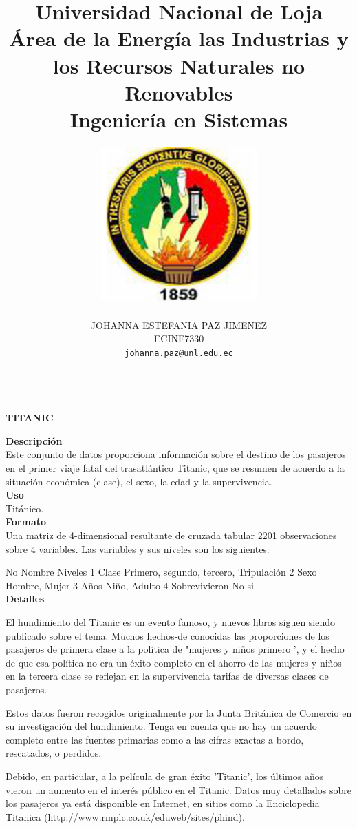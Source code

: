\documentclass[10pt]{report}
\title{\Huge Universidad Nacional de Loja \\ 
Área de la Energía las Industrias y los Recursos Naturales no Renovables \\
Ingeniería en Sistemas \\}
\author{\includegraphics[width=6cm, height=6cm]{unloja.png}\\\\   
  JOHANNA ESTEFANIA PAZ JIMENEZ \\ ECINF7330\\  \texttt{johanna.paz@unl.edu.ec}\\ \\
}
\begin{document}

\maketitle
\begin{center}\textbf{\Large TITANIC}\end{center}

\textbf{Descripción}\\

Este conjunto de datos proporciona información sobre el destino de los pasajeros en el primer viaje fatal del trasatlántico Titanic, que se resumen de acuerdo a la situación económica (clase), el sexo, la edad y la supervivencia.\\

\textbf{Uso}\\

Titánico.\\

\textbf{Formato}\\

Una matriz de 4-dimensional resultante de cruzada tabular 2201 observaciones sobre 4 variables. Las variables y sus niveles son los siguientes:

No	Nombre	Niveles
1	Clase	Primero, segundo, tercero, Tripulación
2	Sexo	Hombre, Mujer
3	Años	Niño, Adulto
4	Sobrevivieron	No si\\


\textbf{Detalles}

El hundimiento del Titanic es un evento famoso, y nuevos libros siguen siendo publicado sobre el tema. Muchos hechos-de conocidas las proporciones de los pasajeros de primera clase a la política de "mujeres y niños primero ', y el hecho de que esa política no era un éxito completo en el ahorro de las mujeres y niños en la tercera clase se reflejan en la supervivencia tarifas de diversas clases de pasajeros.

Estos datos fueron recogidos originalmente por la Junta Británica de Comercio en su investigación del hundimiento. Tenga en cuenta que no hay un acuerdo completo entre las fuentes primarias como a las cifras exactas a bordo, rescatados, o perdidos.

Debido, en particular, a la película de gran éxito 'Titanic', los últimos años vieron un aumento en el interés público en el Titanic. Datos muy detallados sobre los pasajeros ya está disponible en Internet, en sitios como la Enciclopedia Titanica (http://www.rmplc.co.uk/eduweb/sites/phind).\\
\end{document}
